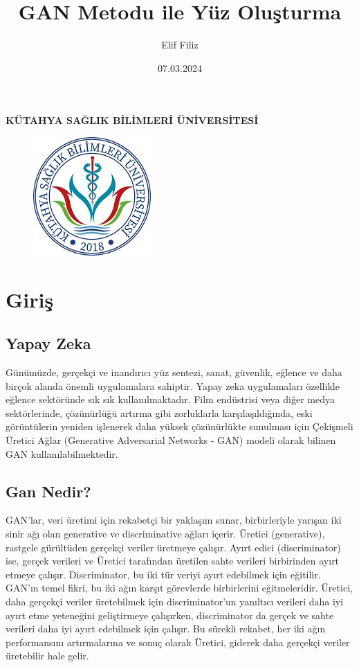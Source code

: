 \documentclass[12pt, a4paper]{article}
\title{\textbf{GAN Metodu ile Yüz Oluşturma}}
\author{Elif Filiz}
\date{07.03.2024}
\begin{document}
	
	\thispagestyle{empty}
	\maketitle 
	
	\textbf{KÜTAHYA SAĞLIK BİLİMLERİ ÜNİVERSİTESİ}\centering
	\begin{figure}[!h]
		\centering
		\includegraphics{ksbu}
	\end{figure}
	\newpage
	\tableofcontents
	\newpage
	\section{Giriş} 
		\raggedright
			\subsection{Yapay Zeka}
		Günümüzde, gerçekçi ve inandırıcı yüz sentezi, sanat, güvenlik, eğlence ve daha birçok alanda önemli uygulamalara sahiptir. Yapay zeka uygulamaları özellikle eğlence sektöründe sık sık kullanılmaktadır\cite{9628901}. Film endüstrisi veya diğer medya sektörlerinde, çözünürlüğü artırma gibi zorluklarla karşılaşıldığında, eski görüntülerin yeniden işlenerek daha yüksek çözünürlükte sunulması için Çekişmeli Üretici Ağlar (Generative Adversarial Networks - GAN) modeli olarak bilinen GAN kullanılabilmektedir\cite{8099502}. 
		
		\subsection{Gan Nedir?}
		GAN'lar, veri üretimi için rekabetçi bir yaklaşım sunar, birbirleriyle yarışan iki sinir ağı olan generative ve discriminative ağları içerir\cite{goodfellow2014generative}. Üretici (generative), rastgele gürültüden gerçekçi veriler üretmeye çalışır. Ayırt edici (discriminator) ise, gerçek verileri ve Üretici tarafından üretilen sahte verileri birbirinden ayırt etmeye çalışır. Discriminator, bu iki tür veriyi ayırt edebilmek için eğitilir. GAN’ın temel fikri, bu iki ağın karşıt görevlerde birbirlerini eğitmeleridir. Üretici, daha gerçekçi veriler üretebilmek için discriminator’un yanıltıcı verileri daha iyi ayırt etme yeteneğini geliştirmeye çalışırken, discriminator da gerçek ve sahte verileri daha iyi ayırt edebilmek için çalışır. Bu sürekli rekabet, her iki ağın performansını artırmalarına ve sonuç olarak Üretici, giderek daha gerçekçi veriler üretebilir hale gelir.
\end{document}
